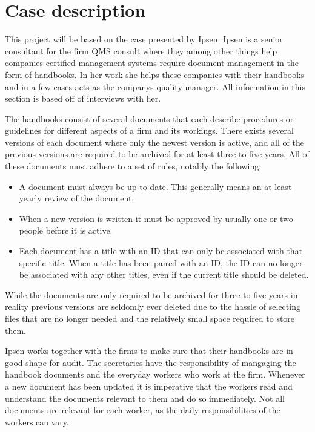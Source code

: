 \section{Case description} \label{sec:CaseDescription}

This project will be based on the case presented by Ipsen. 
Ipsen is a senior consultant for the firm QMS consult where they among other things help companies certified management systems require document management in the form of handbooks.
In her work she helps these companies with their handbooks and in a few cases acts as the companys quality manager.
All information in this section is based off of interviews with her.

The handbooks consist of several documents that each describe procedures or guidelines for different aspects of a firm and its workings.
There exists several versions of each document where only the newest version is active, and all of the previous versions are required to be archived for at least three to five years. All of these documents must adhere to a set of rules, notably the following:

\begin{itemize}
\item A document must always be up-to-date.
This generally means an at least yearly review of the document.
\item When a new version is written it must be approved by usually one or two people before it is active.
\item Each document has a title with an ID that can only be associated with that specific title. 
When a title has been paired with an ID, the ID can no longer be associated with any other titles, even if the current title should be deleted.
\end{itemize}

While the documents are only required to be archived for three to five years in reality previous versions are seldomly ever deleted due to the hassle of selecting files that are no longer needed and the relatively small space required to store them.

Ipsen works together with the firms to make sure that their handbooks are in good shape for audit.
The secretaries have the responsibility of mangaging the handbook documents and the everyday workers who work at the firm.
Whenever a new document has been updated it is imperative that the workers read and understand the documents relevant to them and do so immediately.
Not all documents are relevant for each worker, as the daily responsibilities of the workers can vary.

